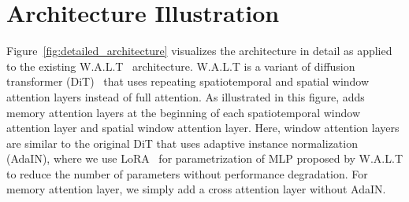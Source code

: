 \section{Architecture Illustration}
\label{appen:archi}

Figure~\ref{fig:detailed_architecture} visualizes the \sname architecture in detail as applied to the existing W.A.L.T~\citep{gupta2023photorealistic} architecture. W.A.L.T is a variant of diffusion transformer (DiT)~\citep{Peebles2022DiT} that uses repeating spatiotemporal and spatial window attention layers instead of full attention. As illustrated in this figure, \sname adds memory attention layers at the beginning of each spatiotemporal window attention layer and spatial window attention layer. Here, window attention layers are similar to the original DiT that uses adaptive instance normalization (AdaIN), where we use LoRA~\cite{hu2021lora} for parametrization of MLP proposed by W.A.L.T to reduce the number of parameters without performance degradation. For memory attention layer, we simply add a cross attention layer without AdaIN.